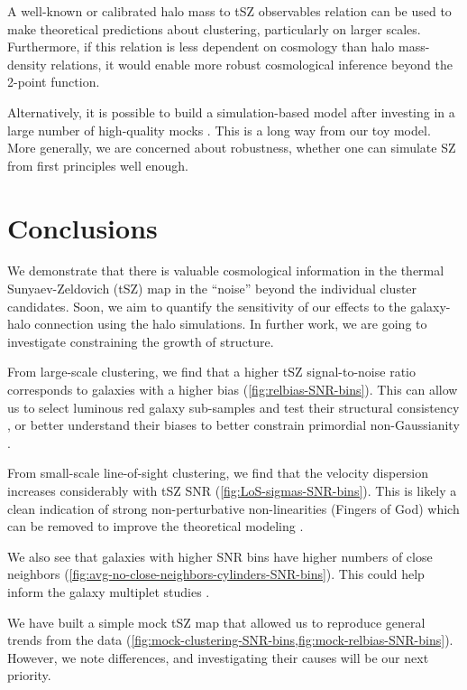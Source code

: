 A well-known or calibrated halo mass to tSZ observables relation can be used to make theoretical predictions about clustering, particularly on larger scales.
Furthermore, if this relation is less dependent on cosmology than halo mass-density relations, it would enable more robust cosmological inference beyond the 2-point function.

Alternatively, it is possible to build a simulation-based model after investing in a large number of high-quality mocks \citep[like for density-split clustering in][]{density-split-clustering-sim-based-model}.
This is a long way from our toy model.
More generally, we are concerned about robustness, whether one can simulate SZ from first principles well enough.

\section{Conclusions}
\label{sec:DESI-tSZ:conclusions}

We demonstrate that there is valuable cosmological information in the thermal Sunyaev-Zeldovich (tSZ) map in the ``noise'' beyond the individual cluster candidates.
Soon, we aim to quantify the sensitivity of our effects to the galaxy-halo connection using the halo simulations.
In further work, we are going to investigate constraining the growth of structure.

From large-scale clustering, we find that a higher tSZ signal-to-noise ratio corresponds to galaxies with a higher bias (\cref{fig:relbias-SNR-bins}).
This can allow us to select luminous red galaxy sub-samples and test their structural consistency \citep[e.g., following][]{LSS-color-dependent-stochasticity},
or better understand their biases to better constrain primordial non-Gaussianity \citep[in the spirit of][]{multi-tracer-PNG-forecasts}.

From small-scale line-of-sight clustering, we find that the velocity dispersion increases considerably with tSZ SNR (\cref{fig:LoS-sigmas-SNR-bins}).
This is likely a clean indication of strong non-perturbative non-linearities (Fingers of God) which can be removed to improve the theoretical modeling \citep{removing-FoG}.

We also see that galaxies with higher SNR bins have higher numbers of close neighbors (\cref{fig:avg-no-close-neighbors-cylinders-SNR-bins}).
This could help inform the galaxy multiplet studies \citep[e.g.][]{DESI-galaxy-multiplets-tidal-field}.

We have built a simple mock tSZ map that allowed us to reproduce general trends from the data (\cref{fig:mock-clustering-SNR-bins,fig:mock-relbias-SNR-bins}).
However, we note differences, and investigating their causes will be our next priority.

